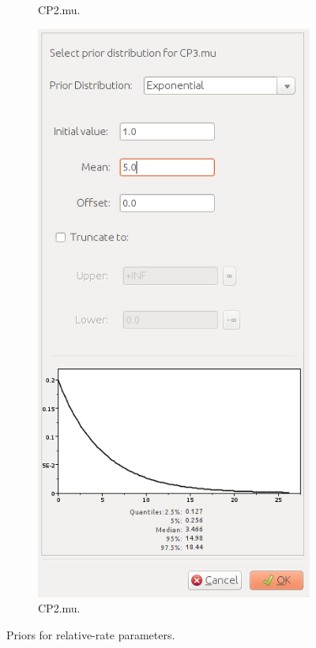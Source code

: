 {\begin{figure}[htbp]
\begin{subfigure}[b]{0.3\textwidth}
            \caption{CP2.mu.}
            \label{fig:beautiPriorsCP2mu}
        \end{subfigure}
        \begin{subfigure}[b]{0.3\textwidth}
            \includegraphics[width=\textwidth]{../screenshots/beauti-prior-cp3mu.jpg}
            \caption{CP2.mu.}
            \label{fig:beautiPriorsCP3mu}
        \end{subfigure}
        \caption{Priors for relative-rate parameters.}
        \label{fig:beautiPriorsCPmu}
    \end{figure}

}
